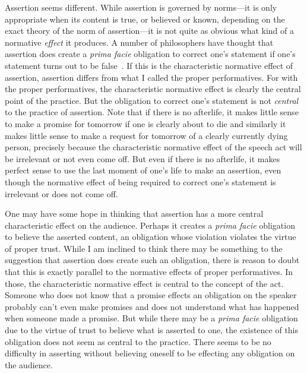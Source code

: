 Assertion seems different. While assertion is governed by norms---it is only appropriate when its content
is true, or believed or known, depending on the exact theory of the norm of assertion---it is not quite as obvious
what kind of a normative \textit{effect} it produces. A number of philosophers have thought that assertion does create
a \textit{prima facie} obligation to correct one's statement if one's statement turns out to be false~\parencite[p.~165]{Dummett1991}. If this is the
characteristic normative effect of assertion, assertion differs from what I called the proper performatives. For with the 
proper performatives, the characteristic normative effect is clearly the central point of the practice. But the 
obligation to correct one's statement is not \textit{central} to the practice of assertion. Note that
if there is no afterlife, it makes little sense to make a promise for tomorrow if one is clearly about to die and 
similarly it makes little sense to make a request for tomorrow of a clearly currently dying person, precisely because
the characteristic normative effect of the speech act will be irrelevant or not even come off. But even if there is 
no afterlife, it makes perfect sense to use the last moment of one's life to make an assertion, even though the
normative effect of being required to correct one's statement is irrelevant or does not come off. 

One may have some hope in thinking that assertion has a more central characteristic effect on the audience.
Perhaps it creates a \textit{prima facie} obligation to believe the asserted content, an obligation whose
violation violates the virtue of proper trust. While I am inclined to think there may be something to the
suggestion that assertion does create such an obligation, there is reason to doubt that this is exactly 
parallel to the normative effects of proper performatives. In those, the characteristic normative effect is central to the concept of the
act. Someone who does not know that a promise effects an obligation on the speaker probably can't even 
make promises and does not understand what has happened when someone made a promise.  But while there may 
be a \textit{prima facie} obligation due to the virtue of trust to believe what is asserted to one, the 
existence of this obligation does not seem as central to the practice. There seems to be no difficulty
in asserting without believing oneself to be effecting any obligation on the audience. 

